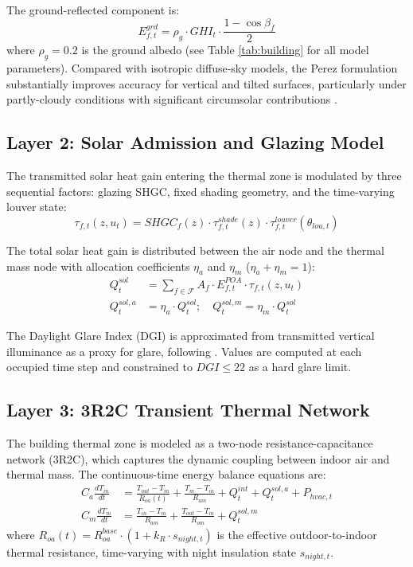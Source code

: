 \documentclass[5p,times,twocolumn]{elsarticle}
\begin{document}
The ground-reflected component is:
\begin{equation}
\label{eq:ground}
E^{grd}_{f,t} = \rho_g \cdot GHI_t \cdot \frac{1 - \cos\beta_f}{2}
\end{equation}
where $\rho_g = 0.2$ is the ground albedo (see Table \ref{tab:building} for all model parameters). Compared with isotropic diffuse-sky models, the Perez formulation substantially improves accuracy for vertical and tilted surfaces, particularly under partly-cloudy conditions with significant circumsolar contributions \cite{perez1990}.

\subsection{Layer 2: Solar Admission and Glazing Model}

The transmitted solar heat gain entering the thermal zone is modulated by three sequential factors: glazing SHGC, fixed shading geometry, and the time-varying louver state:
\begin{equation}
\label{eq:tau}
\tau_{f,t}(z, u_t) = SHGC_f(z) \cdot \tau^{shade}_{f,t}(z) \cdot \tau^{louver}_{f,t}(\theta_{lou,t})
\end{equation}

The total solar heat gain is distributed between the air node and the thermal mass node with allocation coefficients $\eta_a$ and $\eta_m$ ($\eta_a + \eta_m = 1$):
\begin{align}
\label{eq:qsol}
Q^{sol}_t &= \sum_{f \in \mathcal{F}} A_f \cdot E^{POA}_{f,t} \cdot \tau_{f,t}(z, u_t) \\
\label{eq:qsol-dist}
Q^{sol,a}_t &= \eta_a \cdot Q^{sol}_t; \quad Q^{sol,m}_t = \eta_m \cdot Q^{sol}_t
\end{align}

The Daylight Glare Index (DGI) is approximated from transmitted vertical illuminance as a proxy for glare, following \cite{wienold2006}. Values are computed at each occupied time step and constrained to $DGI \leq 22$ as a hard glare limit.

\subsection{Layer 3: 3R2C Transient Thermal Network}

The building thermal zone is modeled as a two-node resistance-capacitance network (3R2C), which captures the dynamic coupling between indoor air and thermal mass. The continuous-time energy balance equations are:
\begin{align}
\label{eq:3r2c-a}
C_a \frac{dT_{in}}{dt} &= \frac{T_{out} - T_{in}}{R_{oa}(t)} + \frac{T_m - T_{in}}{R_{am}} + Q^{int}_t + Q^{sol,a}_t + P_{hvac,t} \\
\label{eq:3r2c-m}
C_m \frac{dT_m}{dt} &= \frac{T_{in} - T_m}{R_{am}} + \frac{T_{out} - T_m}{R_{om}} + Q^{sol,m}_t
\end{align}
where $R_{oa}(t) = R_{oa}^{base} \cdot (1 + k_R \cdot s_{night,t})$ is the effective outdoor-to-indoor thermal resistance, time-varying with night insulation state $s_{night,t}$.
\end{document}
